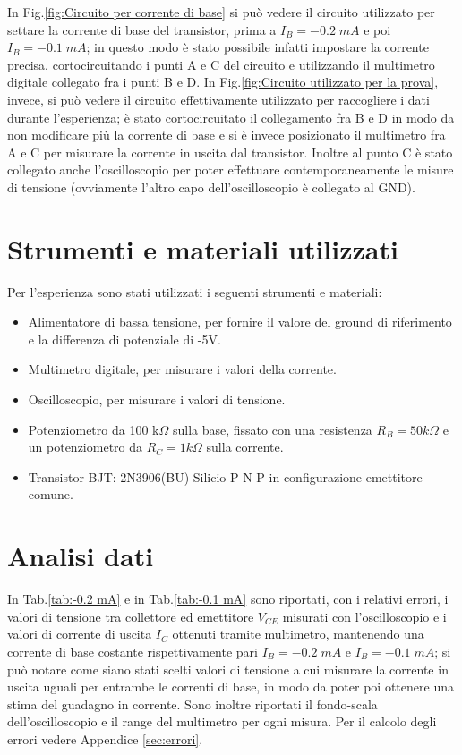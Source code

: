 \documentclass[a4paper, 11pt]{article}
\begin{document}
In Fig.\ref{fig:Circuito per corrente di base} si può vedere il circuito utilizzato per settare la corrente di base del transistor, prima a $I_B = -0.2 \; mA $ e poi $I_B = -0.1 \; mA$; in questo modo è stato possibile infatti impostare la corrente precisa, cortocircuitando i punti A e C del circuito e utilizzando il multimetro digitale collegato fra i punti B e D. In Fig.\ref{fig:Circuito utilizzato per la prova}, invece, si può vedere il circuito effettivamente utilizzato per raccogliere i dati durante l'esperienza; è stato cortocircuitato il collegamento fra B e D in modo da non modificare più la corrente di base e si è invece posizionato il multimetro fra A e C per misurare la corrente in uscita dal transistor. Inoltre al punto C è stato collegato anche l'oscilloscopio per poter effettuare contemporaneamente le misure di tensione (ovviamente l'altro capo dell'oscilloscopio è collegato al GND).

\section{Strumenti e materiali utilizzati}
Per l'esperienza sono stati utilizzati i seguenti strumenti e materiali:
\begin{itemize}
    \item Alimentatore di bassa tensione, per fornire il valore del ground di riferimento e la differenza di potenziale di -5V.
    \item Multimetro digitale, per misurare i valori della corrente.
    \item Oscilloscopio, per misurare i valori di tensione.
    \item Potenziometro da 100 k$\Omega$ sulla base, fissato con una resistenza $R_B = 50 k\Omega$ e un potenziometro da $R_C = 1 k\Omega$ sulla corrente.
    \item Transistor BJT: 2N3906(BU) Silicio P-N-P in configurazione emettitore comune.
\end{itemize}

\section{Analisi dati}
In Tab.\ref{tab:-0.2 mA} e in Tab.\ref{tab:-0.1 mA} sono riportati, con i relativi errori, i valori di tensione tra collettore ed emettitore $V_{CE}$ misurati con l'oscilloscopio e i valori di corrente di uscita $I_C$ ottenuti tramite multimetro, mantenendo una corrente di base costante rispettivamente pari $I_B = -0.2 \;mA $ e $I_B = -0.1 \;mA $; si può notare come siano stati scelti valori di tensione a cui misurare la corrente in uscita uguali per entrambe le correnti di base, in modo da poter poi ottenere una stima del guadagno in corrente. Sono inoltre riportati il fondo-scala dell'oscilloscopio e il range del multimetro per ogni misura. Per il calcolo degli errori vedere Appendice \ref{sec:errori}.
\end{document}
